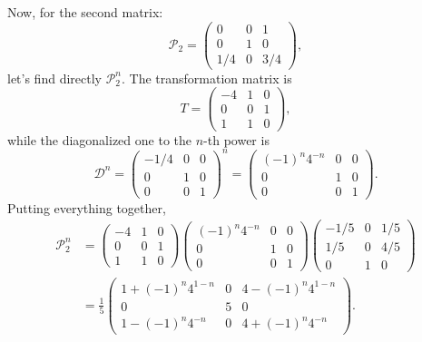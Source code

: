 Now, for the second matrix:
\begin{equation}
    \mathcal{P}_{2} =
    \begin{pmatrix}
         0  &  0  &  1  \\
         0  &  1  &  0  \\
        1/4 &  0  & 3/4
    \end{pmatrix},
\end{equation}
let’s find directly $\mathcal{P}_2^{n}$. The transformation matrix is
\begin{equation}
    T =
    \begin{pmatrix}
        -4 & 1 & 0 \\
        0 & 0 & 1 \\
        1 & 1 & 0
    \end{pmatrix},
\end{equation}
while the diagonalized one to the $n$-th power is
\begin{equation}
    \mathcal{D}^{n} =
    \begin{pmatrix}
        -1/4 & 0 & 0 \\
        0 & 1 & 0 \\
        0 & 0 & 1
    \end{pmatrix}^n
    =
    \begin{pmatrix}
        (-1)^{n} 4^{-n} & 0 & 0 \\
        0 & 1 & 0 \\
        0 & 0 & 1
    \end{pmatrix}.
\end{equation}
Putting everything together,
\begin{equation}
\begin{split}
    \mathcal{P}_2^{n} &=
    \begin{pmatrix}
        -4 & 1 & 0 \\
        0 & 0 & 1 \\
        1 & 1 & 0
    \end{pmatrix}
    \begin{pmatrix}
        (-1)^{n} 4^{-n} & 0 & 0 \\
        0 & 1 & 0 \\
        0 & 0 & 1
    \end{pmatrix}
    \begin{pmatrix}
        -1/5 & 0 & 1/5 \\
        1/5 & 0 & 4/5 \\
        0 & 1 & 0
    \end{pmatrix} \\
                      &= \frac{1}{5}
    \begin{pmatrix}
        1 + (-1)^{n} 4^{1-n} & 0 & 4 - (-1)^{n} 4^{1-n} \\
        0 & 5 & 0 \\
        1 - (-1)^{n} 4^{-n} & 0 & 4 + (-1)^{n} 4^{-n}
    \end{pmatrix}.
\end{split}
\end{equation}
